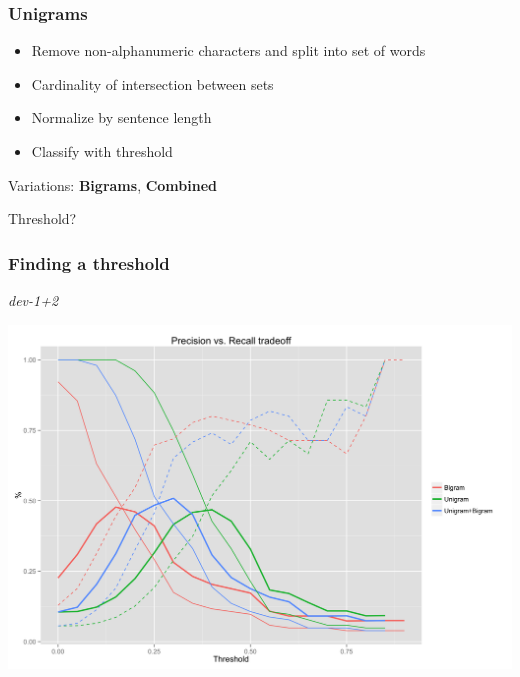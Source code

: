 \documentclass[table]{beamer}
\begin{document}
\begin{frame}
  \frametitle{\textbf{Unigrams}}
  \begin{center}
  \end{center}\pause

  \begin{itemize}
    \item Remove non-alphanumeric characters and split into set of words\pause
    \item Cardinality of intersection between sets\pause
    \item Normalize by sentence length\pause
    \item Classify with threshold\pause
  \end{itemize}

  Variations: \textbf{Bigrams}, \textbf{Combined}

  \vspace{0.5cm}\pause
  Threshold?
\end{frame}

\begin{frame}
  \frametitle{Finding a threshold}
  \center\textit{dev-1+2}

  \quad\includegraphics[scale=0.09]{a.png}
\end{frame}
\end{document}
